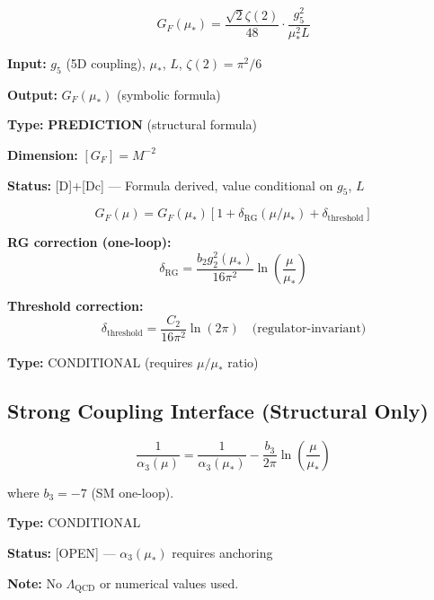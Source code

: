 \documentclass[11pt,a4paper]{article}
\theoremstyle{definition}
\begin{document}
\begin{apibox}
\begin{equation}
\label{eq:api_GF_star}
\boxed{G_F(\mu_*) = \frac{\sqrt{2}\zeta(2)}{48}\cdot\frac{g_5^2}{\mu_*^2 L}}
\end{equation}

\textbf{Input:} $g_5$ (5D coupling), $\mu_*$, $L$, $\zeta(2) = \pi^2/6$

\textbf{Output:} $G_F(\mu_*)$ (symbolic formula)

\textbf{Type:} \textbf{PREDICTION} (structural formula)

\textbf{Dimension:} $[G_F] = M^{-2}$

\textbf{Status:} [D]+[Dc] --- Formula derived, value conditional on $g_5$, $L$
\end{apibox}

\begin{apibox}
\begin{equation}
\label{eq:api_GF_running}
\boxed{G_F(\mu) = G_F(\mu_*)\left[1 + \delta_{\text{RG}}(\mu/\mu_*) + \delta_{\text{threshold}}\right]}
\end{equation}

\textbf{RG correction (one-loop):}
\begin{equation}
\label{eq:GF_delta_RG}
\delta_{\text{RG}} = \frac{b_2 g_2^2(\mu_*)}{16\pi^2}\ln\left(\frac{\mu}{\mu_*}\right)
\end{equation}

\textbf{Threshold correction:}
\begin{equation}
\label{eq:GF_delta_threshold}
\delta_{\text{threshold}} = \frac{C_2}{16\pi^2}\ln(2\pi) \quad \text{(regulator-invariant)}
\end{equation}

\textbf{Type:} CONDITIONAL (requires $\mu/\mu_*$ ratio)
\end{apibox}

\subsection{Strong Coupling Interface (Structural Only)}
\label{subsec:alpha_s_interface}

\begin{apibox}
\begin{equation}
\label{eq:api_alpha_s}
\boxed{\frac{1}{\alpha_3(\mu)} = \frac{1}{\alpha_3(\mu_*)} - \frac{b_3}{2\pi}\ln\left(\frac{\mu}{\mu_*}\right)}
\end{equation}

where $b_3 = -7$ (SM one-loop).

\textbf{Type:} CONDITIONAL

\textbf{Status:} [OPEN] --- $\alpha_3(\mu_*)$ requires anchoring

\textbf{Note:} No $\Lambda_{\text{QCD}}$ or numerical values used.
\end{apibox}
\end{document}
